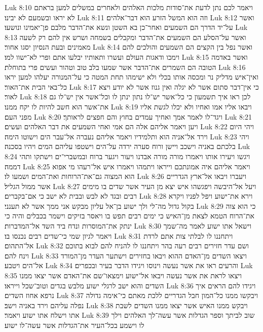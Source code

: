 Luk 8:10  ויאמר לכם נתן לדעת את־סודות מלכות האלהים ולאחרים במשלים למען בראתם לא יראו ובשמעם לא יבינו׃
Luk 8:11  וזה הוא המשל הזרע הוא דבר־אלהים׃
Luk 8:12  ואשר על־יד הדרך הם השמעים ואחר־כן בא השטן ונשא את־הדבר מלבם פן־יאמינו ונושעו׃
Luk 8:13  ואשר על־הסלע הם השמעים את־הדבר ומקבלים בשמחה ושרש אין להם רק לשעה מאמינים ובעת הנסיון יסגו אחור׃
Luk 8:14  ואשר נפל בין הקצים הם השמעים והולכים להם וימכו ודאגות העולם ועשרו ותאותיו יבלעו אתם ופרי לא־ישוו למו׃
Luk 8:15  ואשר באדמה הטובה הם השמרים את־הדבר אשר שמעו בלב טוב וטהור ועשים פרי בתוחלת׃
Luk 8:16  ואין־איש מדליק נר ומכסה אותו בכלי ולא ישימהו תחת המטה כי על־המנורה יעלהו למען יראו כל־באי הבית את־האור׃
Luk 8:17  כי אין־דבר סתום אשר לא יגלה ואין גנוז אשר לא יודע ויצא לאור׃
Luk 8:18  לכן ראו איך תשמעון כי כל־אשר יש־לו נתון ינתן לו וכל־אשר אין יש־לו גם את־אשר הוא חשב להיות לו יקח ממנו׃
Luk 8:19  ויבאו אליו אמו ואחיו ולא יכלו לגשת אליו מפני העם׃
Luk 8:20  ויגד־לו לאמר אמך ואחיך עמדים בחוץ והם חפצים לראותך׃
Luk 8:21  ויען ויאמר אליהם אלה הם אמי ואחי השמעים את דבר האלהים ועשים׃
Luk 8:22  ויהי היום וירד אל־אניה הוא ותלמידיו ויאמר אליהם נעברה אל־עבר הים וישוטו הימה׃
Luk 8:23  ויהי בלכתם באניה וישכב ויישן ורוח סערה ירדה על־הים וישטפו עליהם המים ויהיו בסכנה׃
Luk 8:24  ויגשו ויעירו אותו ויאמרו מורה מורה אבדנו ויעור ויגער ברוח ובמשברי־ים וישתקו ותהי דממה׃
Luk 8:25  ויאמר אליהם איה אמונתכם וייראו ויתמהו ויאמרו איש אל־רעהו מי אפוא הוא המצוה גם־את־הרוחות ואת־המים ושמעו לו׃
Luk 8:26  ויעברו ויבאו אל־ארץ הגדריים אשר ממול הגליל׃
Luk 8:27  ויעל אל־היבשה ויפגשהו איש יצא מן העיר אשר שדים בו מימים רבים ובגד לא לבש ובבית לא ישב כי אם־בקברים׃
Luk 8:28  וירא את־ישוע ויפל לפניו ויקרא בקול גדול מה־לי ולך ישוע בן־אל עליון מבקש אני ממך אשר לא תענני׃
Luk 8:29  כי הוא צוה את־הרוח הטמא לצאת מן־האיש כי ימים רבים תפש בו ויאסר בזיקים וישמר בכבלים והיה כי ינתק את־המוסרות ונדח ביד השד אל־המדברות׃
Luk 8:30  וישאל אתו ישוע לאמר מה־שמך ויאמר לגיון שמי כי־שדים רבים נכנסו בו׃
Luk 8:31  ויתחננו לו לבלתי צות אתם לרדת אל־התהום׃
Luk 8:32  ושם עדר חזירים רבים רעה בהר ויתחננו לו להניח להם לבוא בתוכם וינח להם׃
Luk 8:33  ויצאו השדים מן־האדם ההוא ויבאו בחזירים וישתער העדר מן־המורד אל־הים ויטבע׃
Luk 8:34  והרעים ראו את אשר נעשה וינוסו ויגידו הדבר בעיר ובכפרים׃
Luk 8:35  ויצאו לראת את אשר נעשה ויבאו אל־ישוע וימצאו־שם את־האדם אשר יצאו ממנו השדים והוא ישב לרגלי ישוע מלבש בגדים וטוב־שכל וייראו׃
Luk 8:36  ויגידו להם הראים איך נרפא אחוז השדים׃
Luk 8:37  ויבקשו ממנו כל־המון חבל הגדריים ללכת מאתם כי־אימה גדולה נפלה עליהם וירד באניה וישב׃
Luk 8:38  ויבקש ממנו האיש אשר יצאו ממנו השדים לשבת אתו וישלח אתו ישוע ויאמר׃
Luk 8:39  שוב לביתך וספר הגדלות אשר עשה־לך האלהים וילך לו וישמע בכל־העיר את־הגדלות אשר עשה־לו ישוע׃
